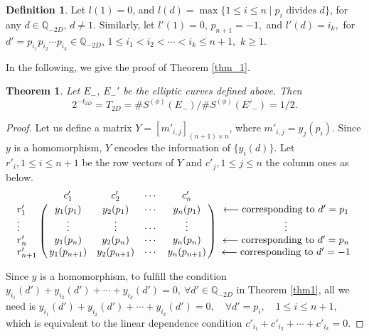 \documentclass{amsart}
\numberwithin{equation}{section}
\theoremstyle{plain}
\newtheorem{thm_}[equation]{Theorem}
\theoremstyle{definition}
\newtheorem{def_}[equation]{Definition}
\newcommand{\thm}[1]{\begin{thm_}#1\end{thm_}}
\newcommand{\defi}[1]{\begin{def_}#1\end{def_}}
\newcommand{\pf}[1]{\begin{proof}#1\end{proof}}
\newcommand{\QQ}{\mathbb Q}
\begin{document}
\defi{\label{def3}Let $l(1) = 0$, and $l(d) = \max\{1 \le i \le n\mid p_i \text{ divides } d\}$, for any $d \in \QQ_{-2D}$, $d \neq 1$. Similarly, let $l'(1) = 0$, $p_{n+1} = -1, $ and $l'(d) = i_k,$ for $d' = p_{i_1}p_{i_2}\cdots p_{i_k} \in \QQ_{-2D}$, $1 \le i_1 < i_2 < \cdots < i_k \le n+1 ,$ $ k \geq 1$. }

In the following, we give the proof of Theorem \ref{thm_1}.
\thm{ \label{thm_n1} Let $E_-$, $E_-'$ be the elliptic curves defined above. Then     $$2^{-t_{2D}} = T_{2D} = \# S^{(\phi)}(E_-)/\# S^{(\phi)}(E'_{-}) = 1/2.$$ 
}
\pf{
 Let us define a matrix $Y = [m'_{i,j}]_{(n+1)\times n}$, where $m'_{i,j} = y_{j}(p_i)$.
 Since $y$ is a homomorphism, $Y$ encodes the information of $\{y_{i}(d)\}$. Let $r'_{i},1 \le i \le n+1$ be the row vectors of $Y$ and $c'_{j},1\le j \le n$ the column ones as below.
\begin{equation}\label{eq:array3}
\bordermatrix{%
       & c'_1       & c'_2     &\cdots     &c'_n\cr
r'_1    &y_{1}(p_1) & y_{2}(p_1) & \cdots  &y_{n}(p_1)\cr
\vdots & \vdots    &\vdots   &\cdots     &\vdots\cr
r'_n 		& y_{1}(p_n) & y_{2}(p_n) & \cdots  &y_{n}(p_n)\cr
r'_{n+1} 		&y_{1}(p_{n+1}) & y_{2}(p_{n+1}) & \cdots  &y_{n}(p_{n+1})
}
\begin{array}{c}
      \longleftarrow  \text{corresponding to $d' = p_1$} \\
		\vdots  \\
	  \longleftarrow  \text{corresponding to $d' = p_n$}\\
	  \longleftarrow  \text{corresponding to $d' = -1$}\\
    \end{array}
\end{equation}

Since $y$ is a homomorphism, to fulfill the condition $y_{i_1}(d')+y_{i_2}(d')+\cdots +y_{i_k}(d') = 0, \ \forall d' \in \QQ_{-2D}$ in Theorem \ref{thm1}, all we need is $y_{i_1}(d')+y_{i_2}(d')+\cdots +y_{i_k}(d') = 0, \quad \forall d' = p_{i}, \quad 1 \le i \le n+1,$ which is equivalent to the linear dependence condition $c'_{i_1}+c'_{i_2}+\cdots+c'_{i_k} = 0$.

}
\end{document}
